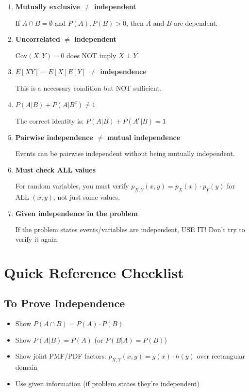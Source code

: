 \documentclass[11pt]{article}
\begin{document}
\begin{tcolorbox}[colback=red!10!white,colframe=red!75!black,title=Common Mistakes]
\begin{enumerate}
    \item \textbf{Mutually exclusive $\neq$ independent}

    If $A \cap B = \emptyset$ and $P(A), P(B) > 0$, then $A$ and $B$ are dependent.

    \item \textbf{Uncorrelated $\neq$ independent}

    $\text{Cov}(X, Y) = 0$ does NOT imply $X \perp Y$.

    \item \textbf{$E[XY] = E[X]E[Y]$ $\neq$ independence}

    This is a necessary condition but NOT sufficient.

    \item \textbf{$P(A|B) + P(A|B^c) \neq 1$}

    The correct identity is: $P(A|B) + P(A^c|B) = 1$

    \item \textbf{Pairwise independence $\neq$ mutual independence}

    Events can be pairwise independent without being mutually independent.

    \item \textbf{Must check ALL values}

    For random variables, you must verify $p_{X,Y}(x, y) = p_X(x) \cdot p_Y(y)$ for ALL $(x, y)$, not just some values.

    \item \textbf{Given independence in the problem}

    If the problem states events/variables are independent, USE IT! Don't try to verify it again.
\end{enumerate}
\end{tcolorbox}

\section{Quick Reference Checklist}

\subsection{To Prove Independence}

\begin{itemize}[leftmargin=*]
    \item[\checkmark] Show $P(A \cap B) = P(A) \cdot P(B)$
    \item[\checkmark] Show $P(A|B) = P(A)$ (or $P(B|A) = P(B)$)
    \item[\checkmark] Show joint PMF/PDF factors: $p_{X,Y}(x, y) = g(x) \cdot h(y)$ over rectangular domain
    \item[\checkmark] Use given information (if problem states they're independent)
\end{itemize}
\end{document}
